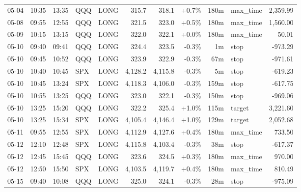\documentclass[11pt,a4paper,twoside]{article}
\begin{document}
\begin{center}
\begin{longtable}{>{\color{txtmain}}l l l l l r r r r >{\color{txtmain}}l r}
05-04 & 10:35 & 13:35 & QQQ & LONG & 315.7 & 318.1 & \textcolor{wingreen}{+0.7\%} & 180m & max\_time & \textcolor{wingreen}{2,359.99} \\
05-08 & 09:55 & 12:55 & QQQ & LONG & 321.5 & 323.0 & \textcolor{wingreen}{+0.5\%} & 180m & max\_time & \textcolor{wingreen}{1,560.00} \\
05-09 & 10:15 & 13:15 & QQQ & LONG & 322.0 & 322.1 & \textcolor{wingreen}{+0.0\%} & 180m & max\_time & \textcolor{wingreen}{50.01} \\
05-10 & 09:40 & 09:41 & QQQ & LONG & 324.4 & 323.5 & \textcolor{lossred}{-0.3\%} & 1m & stop & \textcolor{lossred}{-973.29} \\
05-10 & 09:45 & 10:52 & QQQ & LONG & 323.9 & 322.9 & \textcolor{lossred}{-0.3\%} & 67m & stop & \textcolor{lossred}{-971.61} \\
05-10 & 10:40 & 10:45 & SPX & LONG & 4,128.2 & 4,115.8 & \textcolor{lossred}{-0.3\%} & 5m & stop & \textcolor{lossred}{-619.23} \\
05-10 & 10:45 & 13:24 & SPX & LONG & 4,118.3 & 4,106.0 & \textcolor{lossred}{-0.3\%} & 159m & stop & \textcolor{lossred}{-617.75} \\
05-10 & 10:55 & 13:25 & QQQ & LONG & 323.0 & 322.1 & \textcolor{lossred}{-0.3\%} & 150m & stop & \textcolor{lossred}{-969.06} \\
05-10 & 13:25 & 15:20 & QQQ & LONG & 322.2 & 325.4 & \textcolor{wingreen}{+1.0\%} & 115m & target & \textcolor{wingreen}{3,221.60} \\
05-10 & 13:25 & 15:34 & SPX & LONG & 4,105.4 & 4,146.4 & \textcolor{wingreen}{+1.0\%} & 129m & target & \textcolor{wingreen}{2,052.68} \\
05-11 & 09:55 & 12:55 & SPX & LONG & 4,112.9 & 4,127.6 & \textcolor{wingreen}{+0.4\%} & 180m & max\_time & \textcolor{wingreen}{733.50} \\
05-12 & 12:10 & 12:48 & SPX & LONG & 4,115.8 & 4,103.4 & \textcolor{lossred}{-0.3\%} & 38m & stop & \textcolor{lossred}{-617.37} \\
05-12 & 12:45 & 15:45 & QQQ & LONG & 323.6 & 324.5 & \textcolor{wingreen}{+0.3\%} & 180m & max\_time & \textcolor{wingreen}{970.00} \\
05-12 & 12:50 & 15:50 & SPX & LONG & 4,103.5 & 4,119.7 & \textcolor{wingreen}{+0.4\%} & 180m & max\_time & \textcolor{wingreen}{810.49} \\
05-15 & 09:40 & 10:08 & QQQ & LONG & 325.0 & 324.1 & \textcolor{lossred}{-0.3\%} & 28m & stop & \textcolor{lossred}{-975.09} \\

\end{longtable}
\end{center}
\end{document}
